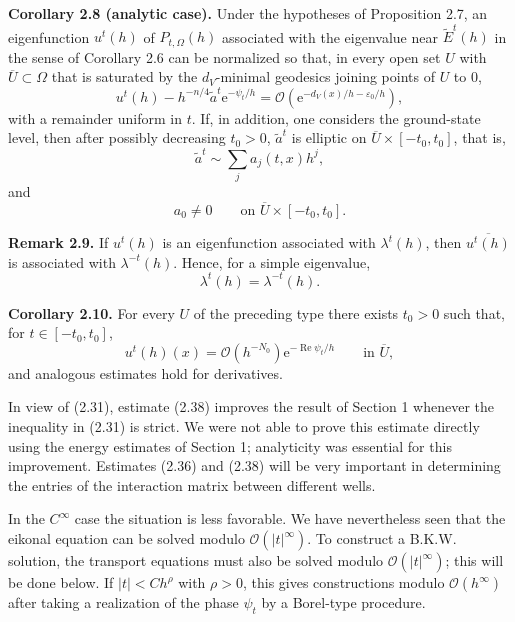 \documentclass[11pt]{article}
\newcommand{\Ree}{\operatorname{Re}}
\newcommand{\OO}{\mathcal O}
\newcommand{\e}{\mathrm{e}}
\begin{document}
\medskip
\noindent\textbf{Corollary 2.8 (analytic case).}
Under the hypotheses of Proposition 2.7, an eigenfunction $u^t(h)$ of $P_{t,\Omega}(h)$ associated with the eigenvalue near $\widetilde E^t(h)$ in the sense of Corollary 2.6 can be normalized so that, in every open set $U$ with $\overline U\subset\Omega$ that is saturated by the $d_V$-minimal geodesics joining points of $U$ to $0$,
\begin{equation}
u^t(h)-h^{-n/4}\widetilde a^t\e^{-\psi_t/h}
=\OO\!\left(\e^{-d_V(x)/h-\varepsilon_0/h}\right),
\tag{2.36}
\end{equation}
with a remainder uniform in $t$.
If, in addition, one considers the ground-state level, then after possibly decreasing $t_0>0$, $\widetilde a^t$ is elliptic on $\overline U\times[-t_0,t_0]$, that is,
\[
\widetilde a^t\sim\sum_j a_j(t,x)h^j,
\]
and
\begin{equation}
a_0\ne0\qquad\text{on }\overline U\times[-t_0,t_0].
\tag{2.37}
\end{equation}

\medskip
\noindent\textbf{Remark 2.9.}
If $u^t(h)$ is an eigenfunction associated with $\lambda^t(h)$, then $\overline{u^t(h)}$ is associated with $\lambda^{-t}(h)$. Hence, for a simple eigenvalue,
\[
\lambda^t(h)=\lambda^{-t}(h).
\]

\medskip
\noindent\textbf{Corollary 2.10.}
For every $U$ of the preceding type there exists $t_0>0$ such that, for $t\in[-t_0,t_0]$,
\begin{equation}
u^t(h)(x)=\OO(h^{-N_0})\e^{-\Ree\psi_t/h}
\qquad\text{in }\overline U,
\tag{2.38}
\end{equation}
and analogous estimates hold for derivatives.

In view of (2.31), estimate (2.38) improves the result of Section 1 whenever the inequality in (2.31) is strict. We were not able to prove this estimate directly using the energy estimates of Section 1; analyticity was essential for this improvement. Estimates (2.36) and (2.38) will be very important in determining the entries of the interaction matrix between different wells.

In the $C^\infty$ case the situation is less favorable. We have nevertheless seen that the eikonal equation can be solved modulo $\OO(|t|^\infty)$. To construct a B.K.W. solution, the transport equations must also be solved modulo $\OO(|t|^\infty)$; this will be done below. If $|t|<Ch^\rho$ with $\rho>0$, this gives constructions modulo $\OO(h^\infty)$ after taking a realization of the phase $\psi_t$ by a Borel-type procedure.
\end{document}
